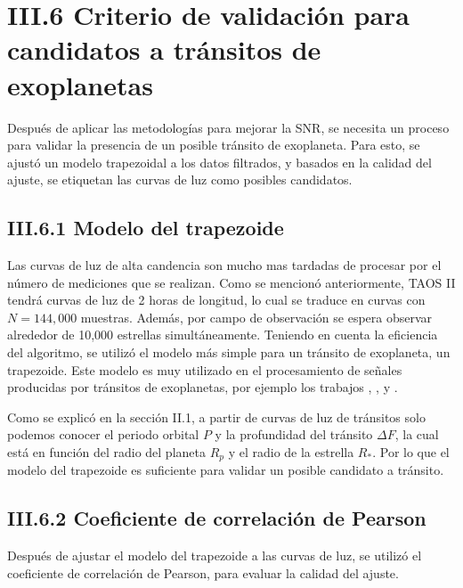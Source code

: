 \section*{III.6 Criterio de validación para candidatos a tránsitos de exoplanetas}

Después de aplicar las metodologías para mejorar la SNR, se necesita un proceso para validar la presencia de un posible tránsito de exoplaneta. Para esto, se ajustó un modelo trapezoidal a los datos filtrados, y basados en la calidad del ajuste, se etiquetan las curvas de luz como posibles candidatos.

\subsection*{III.6.1 Modelo del trapezoide}

Las curvas de luz de alta candencia son mucho mas tardadas de procesar por el número de mediciones que se realizan. Como se mencionó anteriormente, TAOS II tendrá curvas de luz de 2 horas de longitud, lo cual se traduce en curvas con $N=144,000$ muestras. Además, por campo de observación se espera observar alrededor de 10,000 estrellas simultáneamente. Teniendo en cuenta la eficiencia del algoritmo, se utilizó el modelo más simple para un tránsito de exoplaneta, un trapezoide. Este modelo es muy utilizado en el procesamiento de señales producidas por tránsitos de exoplanetas, por ejemplo los trabajos \cite{alapini2010transiting}, \cite{hippke2019optimized}, \cite{kipping2016observational} y \cite{morton2012efficient}.


Como se explicó en la sección II.1, a partir de curvas de luz de tránsitos solo podemos conocer el periodo orbital $P$ y la profundidad del tránsito $\Delta F$, la cual está en función del radio del planeta $R_{p}$ y el radio de la estrella $R_{*}$. Por lo que el modelo del trapezoide es suficiente para validar un posible candidato a tránsito.

\subsection*{III.6.2 Coeficiente de correlación de Pearson}

Después de ajustar el modelo del trapezoide a las curvas de luz, se utilizó el coeficiente de correlación de Pearson, para evaluar la calidad del ajuste. 

